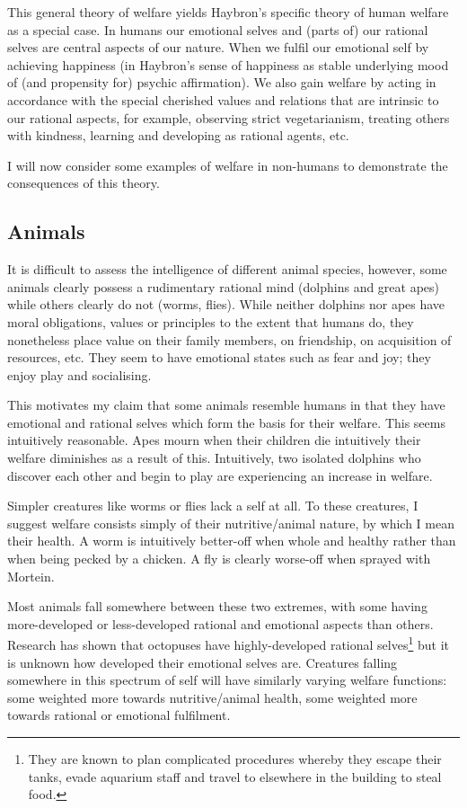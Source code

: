 \documentclass{article}
\begin{document}
This general theory of welfare yields Haybron's specific theory of human welfare as a special case. In humans our emotional selves and (parts of) our rational selves are central aspects of our nature. When we fulfil our emotional self by achieving happiness (in Haybron's sense of happiness as stable underlying mood of (and propensity for) psychic affirmation). We also gain welfare by acting in accordance with the special cherished values and relations that are intrinsic to our rational aspects, for example, observing strict vegetarianism, treating others with kindness, learning and developing as rational agents, etc.

I will now consider some examples of welfare in non-humans to demonstrate the consequences of this theory.

\subsection{Animals}

It is difficult to assess the intelligence of different animal species, however, some animals clearly possess a rudimentary rational mind (dolphins and great apes) while others clearly do not (worms, flies). While neither dolphins nor apes have moral obligations, values or principles to the extent that humans do, they nonetheless place value on their family members, on friendship, on acquisition of resources, etc. They seem to have emotional states such as fear and joy; they enjoy play and socialising. 

This motivates my claim that some animals resemble humans in that they have emotional and rational selves which form the basis for their welfare. This seems intuitively reasonable. Apes mourn when their children die \textemdash{} intuitively their welfare diminishes as a result of this. Intuitively, two isolated dolphins who discover each other and begin to play are experiencing an increase in welfare. 

Simpler creatures like worms or flies lack a self at all. To these creatures, I suggest welfare consists simply of their nutritive/animal nature, by which I mean their health. A worm is intuitively better-off when whole and healthy rather than when being pecked by a chicken. A fly is clearly worse-off when sprayed with Mortein. 

Most animals fall somewhere between these two extremes, with some having more-developed or less-developed rational and emotional aspects than others. Research has shown that octopuses have highly-developed rational selves\footnote{They are known to plan complicated procedures whereby they escape their tanks, evade aquarium staff and travel to elsewhere in the building to steal food.} but it is unknown how developed their emotional selves are. Creatures falling somewhere in this spectrum of self will have similarly varying welfare functions: some weighted more towards nutritive/animal health, some weighted more towards rational or emotional fulfilment.
\end{document}
